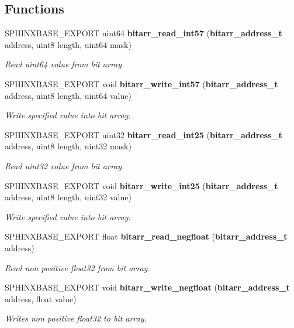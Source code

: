 \subsection*{Functions}
\begin{DoxyCompactItemize}
\item 
S\-P\-H\-I\-N\-X\-B\-A\-S\-E\-\_\-\-E\-X\-P\-O\-R\-T uint64 {\bf bitarr\-\_\-read\-\_\-int57} ({\bf bitarr\-\_\-address\-\_\-t} address, uint8 length, uint64 mask)
\begin{DoxyCompactList}\small\item\em Read uint64 value from bit array. \end{DoxyCompactList}\item 
S\-P\-H\-I\-N\-X\-B\-A\-S\-E\-\_\-\-E\-X\-P\-O\-R\-T void {\bf bitarr\-\_\-write\-\_\-int57} ({\bf bitarr\-\_\-address\-\_\-t} address, uint8 length, uint64 value)
\begin{DoxyCompactList}\small\item\em Write specified value into bit array. \end{DoxyCompactList}\item 
S\-P\-H\-I\-N\-X\-B\-A\-S\-E\-\_\-\-E\-X\-P\-O\-R\-T uint32 {\bf bitarr\-\_\-read\-\_\-int25} ({\bf bitarr\-\_\-address\-\_\-t} address, uint8 length, uint32 mask)
\begin{DoxyCompactList}\small\item\em Read uint32 value from bit array. \end{DoxyCompactList}\item 
S\-P\-H\-I\-N\-X\-B\-A\-S\-E\-\_\-\-E\-X\-P\-O\-R\-T void {\bf bitarr\-\_\-write\-\_\-int25} ({\bf bitarr\-\_\-address\-\_\-t} address, uint8 length, uint32 value)
\begin{DoxyCompactList}\small\item\em Write specified value into bit array. \end{DoxyCompactList}\item 
S\-P\-H\-I\-N\-X\-B\-A\-S\-E\-\_\-\-E\-X\-P\-O\-R\-T float {\bf bitarr\-\_\-read\-\_\-negfloat} ({\bf bitarr\-\_\-address\-\_\-t} address)
\begin{DoxyCompactList}\small\item\em Read non positive float32 from bit array. \end{DoxyCompactList}\item 
S\-P\-H\-I\-N\-X\-B\-A\-S\-E\-\_\-\-E\-X\-P\-O\-R\-T void {\bf bitarr\-\_\-write\-\_\-negfloat} ({\bf bitarr\-\_\-address\-\_\-t} address, float value)
\begin{DoxyCompactList}\small\item\em Writes non positive float32 to bit array. \end{DoxyCompactList}\item 

\end{DoxyCompactItemize}
